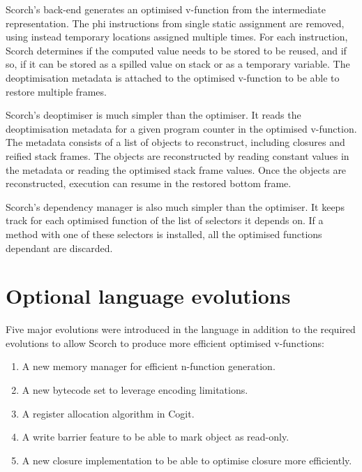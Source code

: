 \documentclass[a4paper,12pt,twoside]{../includes/ThesisStyle}
\begin{document}
Scorch's back-end generates an optimised v-function from the intermediate representation. The phi instructions from single static assignment are removed, using instead temporary locations assigned multiple times. For each instruction, Scorch determines if the computed value needs to be stored to be reused, and if so, if it can be stored as a spilled value on stack or as a temporary variable. The deoptimisation metadata is attached to the optimised v-function to be able to restore multiple frames.

Scorch's deoptimiser is much simpler than the optimiser. It reads the deoptimisation metadata for a given program counter in the optimised v-function. The metadata consists of a list of objects to reconstruct, including closures and reified stack frames. The objects are reconstructed by reading constant values in the metadata or reading the optimised stack frame values. Once the objects are reconstructed, execution can resume in the restored bottom frame.

Scorch's dependency manager is also much simpler than the optimiser. It keeps track for each optimised function of the list of selectors it depends on. If a method with one of these selectors is installed, all the optimised functions dependant are discarded. 


\section{Optional language evolutions}


Five major evolutions were introduced in the language in addition to the required evolutions to allow Scorch to produce more efficient optimised v-functions:
\begin{enumerate}
	\item A new memory manager for efficient n-function generation.
	\item A new bytecode set to leverage encoding limitations.
	\item A register allocation algorithm in Cogit.
	\item A write barrier feature to be able to mark object as read-only.
	\item A new closure implementation to be able to optimise closure more efficiently.
\end{enumerate}
\end{document}
